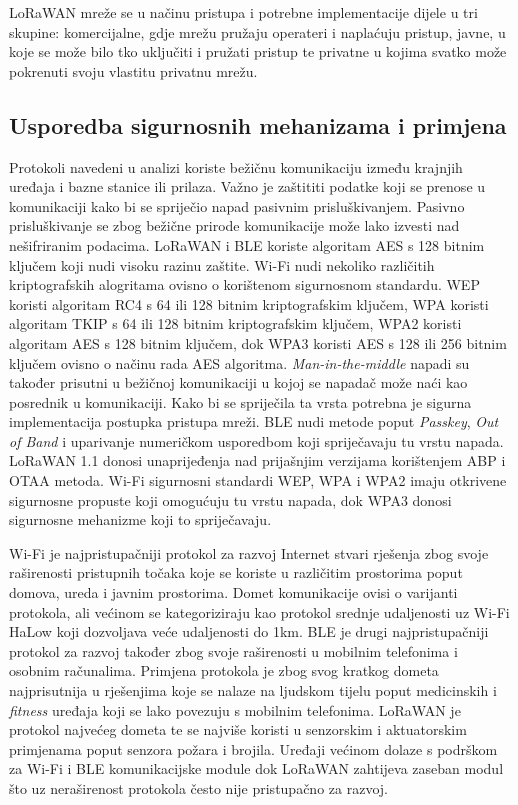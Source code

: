 \documentclass[times, utf8, diplomski]{fer}
\begin{document}
LoRaWAN mreže se u načinu pristupa i potrebne implementacije dijele u tri skupine: komercijalne, gdje mrežu pružaju operateri i naplaćuju pristup, javne, u koje se može bilo tko uključiti i pružati pristup te privatne u kojima svatko može pokrenuti svoju vlastitu privatnu mrežu.

\subsection{Usporedba sigurnosnih mehanizama i primjena}
Protokoli navedeni u analizi koriste bežičnu komunikaciju između krajnjih uređaja i bazne stanice ili prilaza. Važno je zaštititi podatke koji se prenose u komunikaciji kako bi se spriječio napad pasivnim prisluškivanjem. Pasivno prisluškivanje se zbog bežične prirode komunikacije može lako izvesti nad nešifriranim podacima. LoRaWAN i BLE koriste algoritam AES s 128 bitnim ključem koji nudi visoku razinu zaštite. Wi-Fi nudi nekoliko različitih kriptografskih alogritama ovisno o korištenom sigurnosnom standardu. WEP koristi algoritam RC4 s 64 ili 128 bitnim kriptografskim ključem, WPA koristi algoritam TKIP s 64 ili 128 bitnim kriptografskim ključem, WPA2 koristi algoritam AES s 128 bitnim ključem, dok WPA3 koristi AES s 128 ili 256 bitnim ključem ovisno o načinu rada AES algoritma. \emph{Man-in-the-middle} napadi su također prisutni u bežičnoj komunikaciji u kojoj se napadač može naći kao posrednik u komunikaciji. Kako bi se spriječila ta vrsta potrebna je sigurna implementacija postupka pristupa mreži. BLE nudi metode poput \emph{Passkey}, \emph{Out of Band} i uparivanje numeričkom usporedbom koji spriječavaju tu vrstu napada. LoRaWAN 1.1 donosi unaprijeđenja nad prijašnjim verzijama korištenjem ABP i OTAA metoda. Wi-Fi sigurnosni standardi WEP, WPA i WPA2 imaju otkrivene sigurnosne propuste koji omogućuju tu vrstu napada, dok WPA3 donosi sigurnosne mehanizme koji to spriječavaju.  

Wi-Fi je najpristupačniji protokol za razvoj Internet stvari rješenja zbog svoje raširenosti pristupnih točaka koje se koriste u različitim prostorima poput domova, ureda i javnim prostorima. Domet komunikacije ovisi o varijanti protokola, ali većinom se kategoriziraju kao protokol srednje udaljenosti uz Wi-Fi HaLow koji dozvoljava veće udaljenosti do 1km. BLE je drugi najpristupačniji protokol za razvoj također zbog svoje raširenosti u mobilnim telefonima i osobnim računalima. Primjena protokola je zbog svog kratkog dometa najprisutnija u rješenjima koje se nalaze na ljudskom tijelu poput medicinskih i \emph{fitness} uređaja koji se lako povezuju s mobilnim telefonima. LoRaWAN je protokol najvećeg dometa te se najviše koristi u senzorskim i aktuatorskim primjenama poput senzora požara i brojila. Uređaji većinom dolaze s podrškom za Wi-Fi i BLE komunikacijske module dok LoRaWAN zahtijeva zaseban modul što uz neraširenost protokola često nije pristupačno za razvoj.
\end{document}
